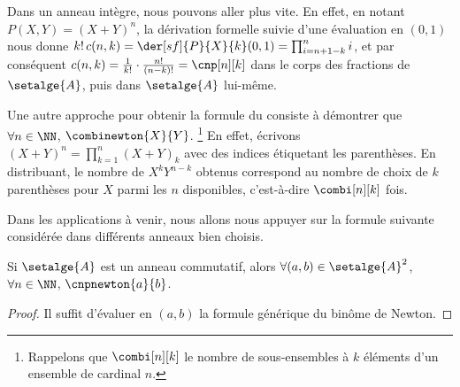 \begin{remark} \label{bino-id-formal-quick}
    Dans un anneau intègre, nous pouvons aller plus vite.
    En effet,
    en notant $P(X,Y) = (X + Y)^n$,
    la dérivation formelle suivie d'une évaluation en $(0,1)$ nous donne
    $k! \, c(n,k) = \der[sf]{P}{X}{k}(0,1) = \prod_{i=n+1-k}^{n} i$,
    et par conséquent
    $c(n,k) = \frac{1}{k!} \cdot \frac{n!}{(n-k)!} = \cnp[n][k]$ 
    dans le corps des fractions de $\setalge{A}$, 
    puis dans $\setalge{A}$ lui-même.
\end{remark}


\begin{remark} \label{bino-id-formal-combi}
    Une autre approche pour obtenir la formule du  consiste à démontrer que
    $\forall n \in \NN$,
	$\combinewton{X}{Y}$.%
    \footnote{
        Rappelons que $\combi[n][k]$ le nombre de sous-ensembles à $k$ éléments d'un ensemble de cardinal $n$.
    }
    En effet,
    écrivons 
    $(X + Y)^n = \prod_{k=1}^{n} (X + Y)_k$ avec des indices étiquetant les parenthèses.
    En distribuant, le nombre de $X^k Y^{n-k}$ obtenus correspond au nombre de choix de $k$ parenthèses pour $X$ parmi les $n$ disponibles, c'est-à-dire $\combi[n][k]$ fois.
\end{remark}




Dans les applications à venir, nous allons nous appuyer sur la formule suivante considérée dans différents anneaux bien choisis.


\begin{fact} \label{bino-id-a-b}
	Si $\setalge{A}$ est un anneau commutatif,
	alors
	$\forall (a, b) \in \setalge{A}^2$,
	$\forall n \in \NN$,
	$\cnpnewton{a}{b}$.
\end{fact}


\begin{proof}
	Il suffit d'évaluer en $(a, b)$ la formule générique du binôme de Newton.
\end{proof}
